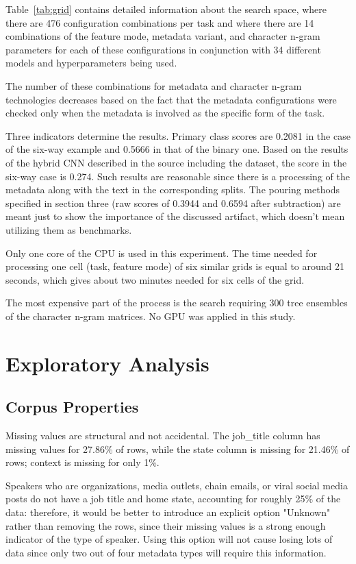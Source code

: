 Table~\ref{tab:grid} contains detailed information about the search space, where there are 476 configuration combinations per task and where there are 14 combinations of the feature mode, metadata variant, and character n-gram parameters for each of these configurations in conjunction with 34 different models and hyperparameters being used.



The number of these combinations for metadata and character n-gram technologies decreases based on the fact that the metadata configurations were checked only when the metadata is involved as the specific form of the task.

Three indicators determine the results. Primary class scores are 0.2081 in the case of the six-way example and 0.5666 in that of the binary one. Based on the results of the hybrid CNN described in the source including the dataset, the score in the six-way case is 0.274. Such results are reasonable since there is a processing of the metadata along with the text in the corresponding splits. The pouring methods specified in section three (raw scores of 0.3944 and 0.6594 after subtraction) are meant just to show the importance of the discussed artifact, which doesn't mean utilizing them as benchmarks.

Only one core of the CPU is used in this experiment. The time needed for processing one cell (task, feature mode) of six similar grids is equal to around 21 seconds, which gives about two minutes needed for six cells of the grid.

The most expensive part of the process is the search requiring 300 tree ensembles of the character n-gram matrices. No GPU was applied in this study.

\section{Exploratory Analysis}

\subsection{Corpus Properties}

Missing values are structural and not accidental. The job\_title column has missing values for 27.86\% of rows, while the state column is missing for 21.46\% of rows; context is missing for only 1\%.

Speakers who are organizations, media outlets, chain emails, or viral social media posts do not have a job title and home state, accounting for roughly 25\% of the data: therefore, it would be better to introduce an explicit option "Unknown" rather than removing the rows, since their missing values is a strong enough indicator of the type of speaker. Using this option will not cause losing lots of data since only two out of four metadata types will require this information.

